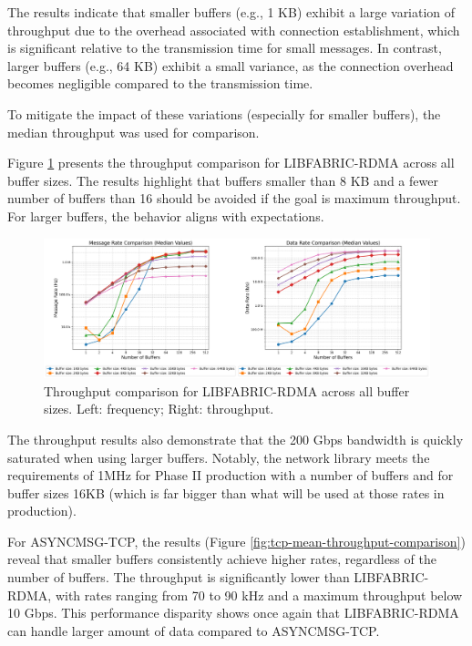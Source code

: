 The results indicate that smaller buffers (e.g., 1 KB) exhibit a large variation of throughput due to the overhead associated with connection establishment, which is significant relative to the transmission time for small messages. In contrast, larger buffers (e.g., 64 KB) exhibit a small variance, as the connection overhead becomes negligible compared to the transmission time.

To mitigate the impact of these variations (especially for smaller buffers), the median throughput was used for comparison.

Figure \ref{fig:libfabric-mean-throughput-comparison} presents the throughput comparison for LIBFABRIC-RDMA across all buffer sizes. The results highlight that buffers smaller than 8 KB and a fewer number of buffers than 16 should be avoided if the goal is maximum throughput. For larger buffers, the behavior aligns with expectations. 

\begin{figure}[htbp]
\centering
\includegraphics[width=\textwidth]{images/results/libfabric_performance_comparison.png}
\caption[Throughput comparison for LIBFABRIC-RDMA across all buffer sizes]{Throughput comparison for LIBFABRIC-RDMA across all buffer sizes. Left: frequency; Right: throughput.}
\label{fig:libfabric-mean-throughput-comparison}
\end{figure}

The throughput results also demonstrate that the 200 Gbps bandwidth is quickly saturated when using larger buffers. Notably, the network library meets the requirements of 1MHz for Phase II production with a number of buffers  and for buffer sizes \leq 16KB (which is far bigger than what will be used at those rates in production).

For ASYNCMSG-TCP, the results (Figure \ref{fig:tcp-mean-throughput-comparison}) reveal that smaller buffers consistently achieve higher rates, regardless of the number of buffers. The throughput is significantly lower than LIBFABRIC-RDMA, with rates ranging from 70 to 90 kHz and a maximum throughput below 10 Gbps. This performance disparity shows once again that LIBFABRIC-RDMA can handle larger amount of data compared to ASYNCMSG-TCP.

